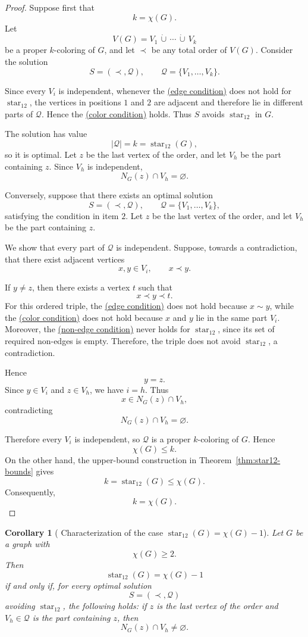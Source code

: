 \documentclass[12pt]{article}
\theoremstyle{plain}
\newtheorem{corollary}[theorem]{Corollary}
\theoremstyle{definition}
\theoremstyle{remark}
\theoremstyle{definition}
\newcommand{\edgecondition}{%
  \hyperref[def:avoid:cond:edge]{(edge condition)}\xspace
}
\newcommand{\nonedgecondition}{%
  \hyperref[def:avoid:cond:nonedge]{(non-edge condition)}\xspace
}
\newcommand{\colorcondition}{%
  \hyperref[def:avoid:cond:color]{(color condition)}\xspace
}
\newcommand{\starlabel}{\mathrm{star}}
\DeclareRobustCommand{\starparam}[1]{%
  \ensuremath{\mathop{\starlabel}\nolimits_{#1}}%
}
\begin{document}
\begin{proof}
Suppose first that
\[
k=\chi(G).
\]
Let
\[
V(G)=V_1\,\dot\cup\,\cdots\,\dot\cup\,V_k
\]
be a proper \(k\)-coloring of \(G\), and let \(\prec\) be any total order
of \(V(G)\). Consider the solution
\[
S=(\prec,\mathcal Q),
\qquad
\mathcal Q=\{V_1,\dots,V_k\}.
\]

Since every \(V_i\) is independent, whenever the \edgecondition{} does not
hold for \(\starparam{12}\), the vertices in positions \(1\) and \(2\)
are adjacent and therefore lie in different parts of \(\mathcal Q\).
Hence the \colorcondition{} holds. Thus \(S\) avoids
\(\starparam{12}\) in \(G\).

The solution has value
\[
|\mathcal Q|=k=\starparam{12}(G),
\]
so it is optimal. Let \(z\) be the last vertex of the order, and let
\(V_h\) be the part containing \(z\). Since \(V_h\) is independent,
\[
N_G(z)\cap V_h=\varnothing.
\]

Conversely, suppose that there exists an optimal solution
\[
S=(\prec,\mathcal Q),
\qquad
\mathcal Q=\{V_1,\dots,V_k\},
\]
satisfying the condition in item \(2\). Let \(z\) be the last vertex of
the order, and let \(V_h\) be the part containing \(z\).

We show that every part of \(\mathcal Q\) is independent. Suppose,
towards a contradiction, that there exist adjacent vertices
\[
x,y\in V_i,
\qquad
x\prec y.
\]

If \(y\neq z\), then there exists a vertex \(t\) such that
\[
x\prec y\prec t.
\]
For this ordered triple, the \edgecondition{} does not hold because
\(x\sim y\), while the \colorcondition{} does not hold because
\(x\) and \(y\) lie in the same part \(V_i\). Moreover, the
\nonedgecondition{} never holds for \(\starparam{12}\), since its set of
required non-edges is empty. Therefore, the triple does not avoid
\(\starparam{12}\), a contradiction.

Hence
\[
y=z.
\]
Since \(y\in V_i\) and \(z\in V_h\), we have \(i=h\). Thus
\[
x\in N_G(z)\cap V_h,
\]
contradicting
\[
N_G(z)\cap V_h=\varnothing.
\]

Therefore every \(V_i\) is independent, so \(\mathcal Q\) is a proper
\(k\)-coloring of \(G\). Hence
\[
\chi(G)\le k.
\]
On the other hand, the upper-bound construction in
Theorem~\ref{thm:star12-bounds} gives
\[
k=\starparam{12}(G)\le\chi(G).
\]
Consequently,
\[
k=\chi(G).
\]
\end{proof}




\begin{corollary}[
Characterization of the case
\texorpdfstring{\(\starparam{12}(G)=\chi(G)-1\)}
{star12(G) = chi(G) - 1}
]
\label{cor:star12-equals-chi-minus-one}
Let \(G\) be a graph with
\[
\chi(G)\ge 2.
\]
Then
\[
\starparam{12}(G)=\chi(G)-1
\]
if and only if, for every optimal solution
\[
S=(\prec,\mathcal Q)
\]
avoiding \(\starparam{12}\), the following holds: if \(z\) is the last
vertex of the order and \(V_h\in\mathcal Q\) is the part containing \(z\),
then
\[
N_G(z)\cap V_h\neq\varnothing.
\]
\end{corollary}
\end{document}
